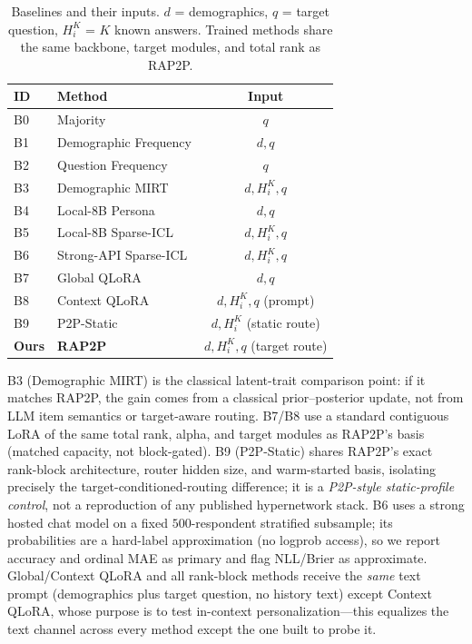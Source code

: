 \documentclass[letterpaper]{article} %
\begin{document}
\begin{table}[t]
\centering
\caption{Baselines and their inputs. $d$ = demographics, $q$ = target
question, $H_i^K$ = $K$ known answers. Trained methods share the same backbone,
target modules, and total rank as RAP2P.}
\label{tab:baselines}
\setlength{\tabcolsep}{4pt}
\begin{tabular}{llc}
\toprule
ID & Method & Input \\
\midrule
B0 & Majority                       & $q$ \\
B1 & Demographic Frequency          & $d,q$ \\
B2 & Question Frequency             & $q$ \\
B3 & Demographic MIRT               & $d,H_i^K,q$ \\
B4 & Local-8B Persona               & $d,q$ \\
B5 & Local-8B Sparse-ICL            & $d,H_i^K,q$ \\
B6 & Strong-API Sparse-ICL          & $d,H_i^K,q$ \\
B7 & Global QLoRA                   & $d,q$ \\
B8 & Context QLoRA                  & $d,H_i^K,q$ (prompt) \\
B9 & P2P-Static                     & $d,H_i^K$ (static route) \\
\textbf{Ours} & \textbf{RAP2P}      & $d,H_i^K,q$ (target route) \\
\bottomrule
\end{tabular}
\end{table}

B3 (Demographic MIRT) is the classical latent-trait comparison point: if it
matches RAP2P, the gain comes from a classical prior--posterior update, not
from LLM item semantics or target-aware routing. B7/B8 use a standard
contiguous LoRA of the same total rank, alpha, and target modules as RAP2P's
basis (matched capacity, not block-gated). B9 (P2P-Static) shares RAP2P's exact
rank-block architecture, router hidden size, and warm-started basis, isolating
precisely the target-conditioned-routing difference; it is a
\emph{P2P-style static-profile control}, not a reproduction of any published
hypernetwork stack. B6 uses a strong hosted chat model on a fixed
$500$-respondent stratified subsample; its probabilities are a hard-label
approximation (no logprob access), so we report accuracy and ordinal MAE as
primary and flag NLL/Brier as approximate. Global/Context QLoRA and all
rank-block methods receive the \emph{same} text prompt (demographics plus
target question, no history text) except Context QLoRA, whose purpose is to
test in-context personalization---this equalizes the text channel across every
method except the one built to probe it.
\end{document}
